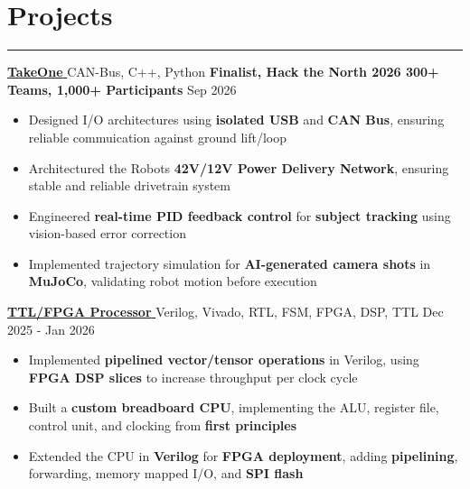 \documentclass[10pt]{article}
\newcommand{\MHtLsep}{-0.7em}
\newcommand{\LtHsep}{0.9em}
\begin{document}
\section*{\large {Projects}} \vspace{\MHtLsep} \hrule 
\vspace{\LtHsep}

\href{https://devpost.com/software/takeone-erqv3l}{\textbf{TakeOne \footnotesize\faExternalLink*}} \hspace{\WEVBsep}\textbar\hspace{\WEVBsep} CAN-Bus, C++, Python \hfill \textbf{Finalist, Hack the North 2026 300+ Teams, 1,000+ Participants  } Sep 2026 \\[\PTtPsep]
\begin{itemize}
    \item  Designed I/O architectures using \textbf{isolated USB} and \textbf{CAN Bus}, ensuring reliable commuication against ground lift/loop\\[\PtPsep]
    \item  Architectured the Robots \textbf{42V/12V Power Delivery Network}, ensuring stable and reliable drivetrain system \\[\PtPsep]
    \item  Engineered \textbf{real-time PID feedback control} for \textbf{subject tracking} using vision-based error correction\\[\PtPsep]
    \item  Implemented trajectory simulation for \textbf{AI-generated camera shots} in \textbf{MuJoCo}, validating robot motion before execution \\[\PStPSsep]
\end{itemize}

\noindent\href{https://www.ryanqin.com/projects.html}{\textbf{TTL/FPGA Processor \footnotesize\faExternalLink*}} \hspace{\WEVBsep}\textbar\hspace{\WEVBsep} Verilog, Vivado, RTL, FSM, FPGA, DSP, TTL \hfill Dec 2025 - Jan 2026 \\[\PTtPsep]
\begin{itemize}
    \item Implemented \textbf{pipelined vector/tensor operations} in Verilog, using \textbf{FPGA DSP slices} to increase throughput per clock cycle\\[\PtPsep]
    \item Built a \textbf{custom breadboard CPU}, implementing the ALU, register file, control unit, and clocking from \textbf{first principles}\\[\PtPsep]
    \item Extended the CPU in \textbf{Verilog} for \textbf{FPGA deployment}, adding \textbf{pipelining}, forwarding, memory mapped I/O, and \textbf{SPI flash}\\[\PStPSsep]
\end{itemize}
\end{document}
